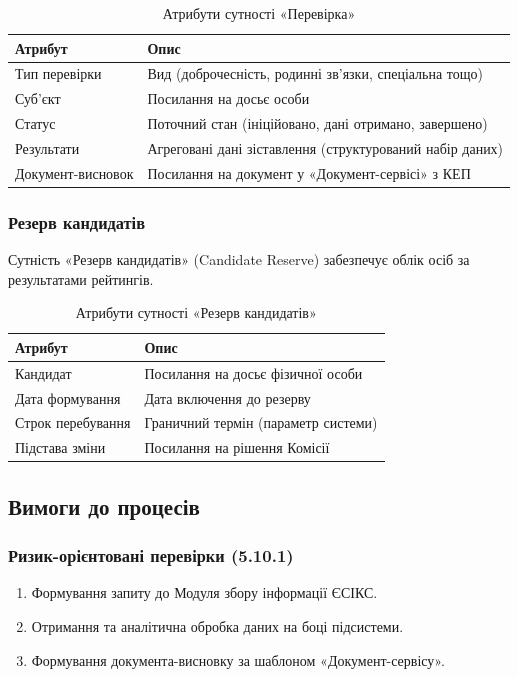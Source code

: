 \documentclass{article}
\begin{document}
\begin{table}[ht]
\caption{Атрибути сутності «Перевірка»}
\begin{tabular}{p{5cm}p{9cm}}
\hline
\textbf{Атрибут} & \textbf{Опис} \\
\hline
Тип перевірки & Вид (доброчесність, родинні зв'язки, спеціальна тощо) \\
Суб'єкт & Посилання на досьє особи \\
Статус & Поточний стан (ініційовано, дані отримано, завершено) \\
Результати & Агреговані дані зіставлення (структурований набір даних) \\
Документ-висновок & Посилання на документ у «Документ-сервісі» з КЕП \\
\hline
\end{tabular}
\end{table}

\subsubsection{Резерв кандидатів}
Сутність «Резерв кандидатів» (Candidate Reserve) забезпечує облік осіб за результатами рейтингів.

\begin{table}[ht]
\caption{Атрибути сутності «Резерв кандидатів»}
\begin{tabular}{p{5cm}p{9cm}}
\hline
\textbf{Атрибут} & \textbf{Опис} \\
\hline
Кандидат & Посилання на досьє фізичної особи \\
Дата формування & Дата включення до резерву \\
Строк перебування & Граничний термін (параметр системи) \\
Підстава зміни & Посилання на рішення Комісії \\
\hline
\end{tabular}
\end{table}

\newpage
\subsection{Вимоги до процесів}

\subsubsection{Ризик-орієнтовані перевірки (5.10.1)}
\begin{enumerate}
    \item Формування запиту до Модуля збору інформації ЄСІКС.
    \item Отримання та аналітична обробка даних на боці підсистеми.
    \item Формування документа-висновку за шаблоном «Документ-сервісу».
\end{enumerate}
\end{document}
